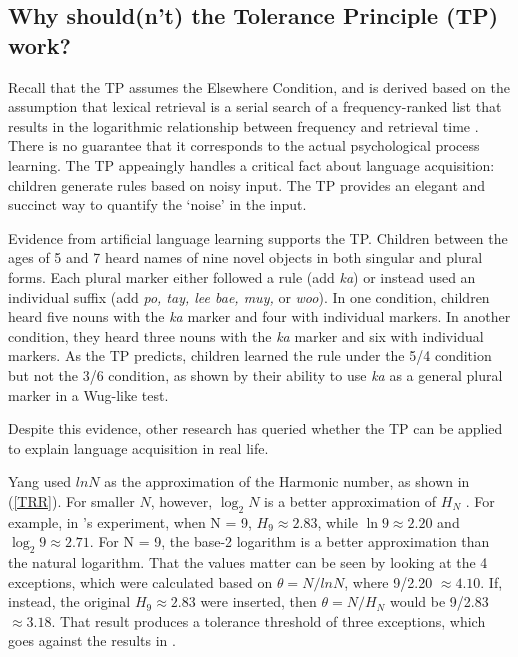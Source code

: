 \subsection{Why should(n't) the Tolerance Principle (TP) work?}
Recall that the TP assumes the Elsewhere Condition, and is derived based on the assumption that lexical retrieval is a serial search of a frequency-ranked list that results in the logarithmic relationship between frequency and retrieval time \citep{murray2004serial}. 
There is no guarantee that it corresponds to the actual psychological process learning. The TP appeaingly handles a critical fact about language acquisition: children generate rules based on noisy input. The TP provides an elegant and succinct way to quantify the `noise' in the input. 

Evidence from artificial language learning \citep{schuler2016testing} supports the TP. Children between the ages of 5 and 7 heard names of nine novel objects in both singular and plural forms. Each plural marker either followed a rule (add \textit{ka}) or instead used an individual suffix (add \textit{po, tay,  lee bae, muy,} or \textit{woo}). In one condition, children heard five nouns with the \textit{ka} marker and four with individual markers. In another condition, they heard three nouns with the \textit{ka} marker and six with individual markers. As the TP predicts, children learned the rule under the 5/4 condition but not the 3/6 condition, as shown by their ability to use \textit{ka} as a general plural marker in a Wug-like test. 

Despite this evidence, other research has queried whether the TP can be applied to explain language acquisition in real life. 

Yang used $lnN$ as the approximation of the Harmonic number, as shown in (\ref{TRR}). For smaller $N$, however, {$\log_2 N$} is a better approximation of $H_N$ \citep{andreae2018charles}. For example, in \cite{schuler2016testing}'s experiment, when N = 9, $H_9 \approx 2.83$, while $\ln 9 \approx 2.20$ and $\log_2 9 \approx 2.71$. For N = 9, the base-2 logarithm is a better approximation than the natural logarithm. That the values matter can be seen by looking at the 4 exceptions, which were calculated based on $\theta =  N/lnN$, where 9/2.20 $\approx 4.10$. If, instead, the original $H_9 \approx 2.83$ were inserted, then $\theta =  N/H_N$ would be 9/2.83 $\approx 3.18$. That result produces a tolerance threshold of three exceptions, which goes against the results in \cite{schuler2016testing}.  

